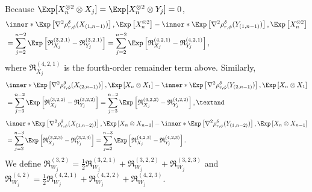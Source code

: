 \documentclass[aos]{imsart}
\begin{document}
\begin{appendix}
\begin{equation*}
\end{equation*}
Because $\Exp[X_n^{\otimes 2} \otimes X_j] = \Exp[X_n^{\otimes 2} \otimes Y_j] = 0$, 
\begin{equation*}
\begin{aligned}
    & \inner*{ 
        \Exp\left[ \nabla^2 \rho_{r,\phi}^\delta(X_{(1,n-1)}) \right], 
        \Exp\left[ X_n^{\otimes 2} \right]}
    - \inner*{ 
        \Exp\left[ \nabla^2 \rho_{r,\phi}^\delta(Y_{(1,n-1)}) \right], 
        \Exp\left[ X_n^{\otimes 2} \right]} \\
    & = \sum_{j=2}^{n-2} \Exp\left[ \mathfrak{R}_{X_j}^{(3,2,1)} - \mathfrak{R}_{Y_j}^{(3,2,1)} \right] 
    = \sum_{j=2}^{n-2} \Exp\left[ \mathfrak{R}_{X_j}^{(4,2,1)} - \mathfrak{R}_{Y_j}^{(4,2,1)} \right],
\end{aligned}
\end{equation*}
where $\mathfrak{R}_{X_j}^{(4,2,1)}$ is the fourth-order remainder term above. Similarly,
\begin{equation*}
\begin{aligned}
    & \inner*{ 
        \Exp\left[ \nabla^2 \rho_{r,\phi}^\delta(X_{(2,n-1)}) \right], 
        \Exp\left[ X_n \otimes X_1 \right]}
    - \inner*{ 
        \Exp\left[ \nabla^2 \rho_{r,\phi}^\delta(Y_{(2,n-1)}) \right], 
        \Exp\left[ X_n \otimes X_1 \right]} \\
    & = \sum_{j=3}^{n-2} \Exp\left[ \mathfrak{R}_{X_j}^{(3,2,2)} - \mathfrak{R}_{Y_j}^{(3,2,2)} \right] 
    = \sum_{j=3}^{n-2} \Exp\left[ \mathfrak{R}_{X_j}^{(4,2,2)} - \mathfrak{R}_{Y_j}^{(4,2,2)} \right], \textand
\end{aligned}
\end{equation*}
\begin{equation*}
\begin{aligned}
    & \inner*{ 
        \Exp\left[ \nabla^2 \rho_{r,\phi}^\delta(X_{(1,n-2)}) \right], 
        \Exp\left[ X_n \otimes X_{n-1} \right]}
    - \inner*{ 
        \Exp\left[ \nabla^2 \rho_{r,\phi}^\delta(Y_{(1,n-2)}) \right], 
        \Exp\left[ X_n \otimes X_{n-1} \right]} \\
    & = \sum_{j=2}^{n-3} \Exp\left[ \mathfrak{R}_{X_j}^{(3,2,3)} - \mathfrak{R}_{Y_j}^{(3,2,3)} \right] 
    = \sum_{j=2}^{n-3} \Exp\left[ \mathfrak{R}_{X_j}^{(4,2,3)} - \mathfrak{R}_{Y_j}^{(4,2,3)} \right].
\end{aligned}
\end{equation*}
We define $\mathfrak{R}_{W_j}^{(3,2)} = \frac{1}{2} \mathfrak{R}_{W_j}^{(3,2,1)} + \mathfrak{R}_{W_j}^{(3,2,2)} + \mathfrak{R}_{W_j}^{(3,2,3)}$ and $\mathfrak{R}_{W_j}^{(4,2)} = \frac{1}{2} \mathfrak{R}_{W_j}^{(4,2,1)} + \mathfrak{R}_{W_j}^{(4,2,2)} + \mathfrak{R}_{W_j}^{(4,2,3)}$.



\end{appendix}
\end{document}
